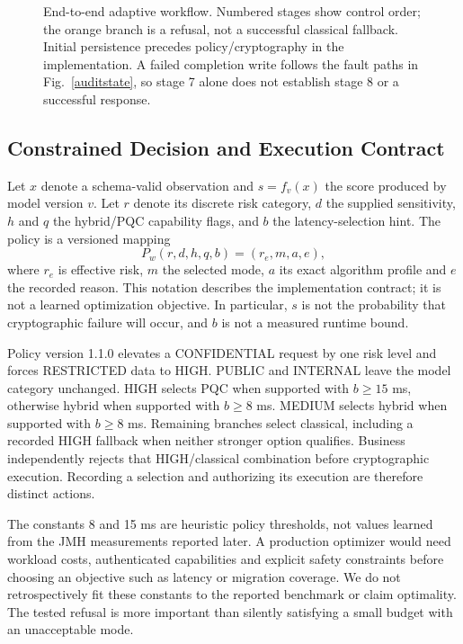 \documentclass[conference,a4paper]{IEEEtran}
\begin{document}
\begin{figure}[t]
\caption{End-to-end adaptive workflow. Numbered stages show control order; the orange branch is a refusal, not a successful classical fallback. Initial persistence precedes policy/cryptography in the implementation. A failed completion write follows the fault paths in Fig.~\ref{auditstate}, so stage 7 alone does not establish stage 8 or a successful response.}
\label{workflow}
\end{figure}

\subsection{Constrained Decision and Execution Contract}
Let $x$ denote a schema-valid observation and $s=f_v(x)$ the score produced by model version $v$. Let $r$ denote its discrete risk category, $d$ the supplied sensitivity, $h$ and $q$ the hybrid/PQC capability flags, and $b$ the latency-selection hint. The policy is a versioned mapping
\begin{equation}
 P_w(r,d,h,q,b)=(r_e,m,a,e),
\end{equation}
where $r_e$ is effective risk, $m$ the selected mode, $a$ its exact algorithm profile and $e$ the recorded reason. This notation describes the implementation contract; it is not a learned optimization objective. In particular, $s$ is not the probability that cryptographic failure will occur, and $b$ is not a measured runtime bound.

Policy version 1.1.0 elevates a CONFIDENTIAL request by one risk level and forces RESTRICTED data to HIGH. PUBLIC and INTERNAL leave the model category unchanged. HIGH selects PQC when supported with $b\geq15$ ms, otherwise hybrid when supported with $b\geq8$ ms. MEDIUM selects hybrid when supported with $b\geq8$ ms. Remaining branches select classical, including a recorded HIGH fallback when neither stronger option qualifies. Business independently rejects that HIGH/classical combination before cryptographic execution. Recording a selection and authorizing its execution are therefore distinct actions.

The constants 8 and 15 ms are heuristic policy thresholds, not values learned from the JMH measurements reported later. A production optimizer would need workload costs, authenticated capabilities and explicit safety constraints before choosing an objective such as latency or migration coverage. We do not retrospectively fit these constants to the reported benchmark or claim optimality. The tested refusal is more important than silently satisfying a small budget with an unacceptable mode.
\end{document}
